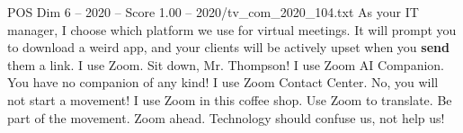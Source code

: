 \begin{textsample}{POS Dim 6 – 2020 – Score 1.00 – 2020/tv\_com\_2020\_104.txt}  \label{ex:f6_pos_048}
As your IT manager, I choose which platform we use for virtual meetings.
It will prompt you to download a weird app, and your clients will be actively upset when you \textbf{send} them a link.
I use Zoom.
Sit down, Mr.
Thompson!
I use Zoom AI Companion.
You have no companion of any kind!
I use Zoom Contact Center.
No, you will not start a movement!
I use Zoom in this coffee shop.
Use Zoom to translate.
Be part of the movement.
Zoom ahead.
Technology should confuse us, not help us!

\end{textsample}
